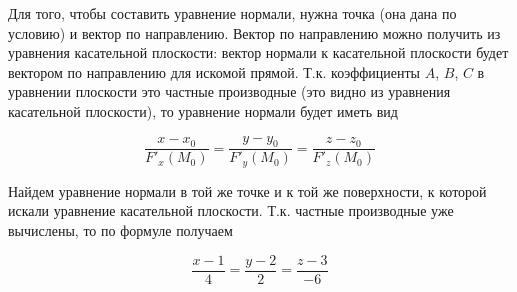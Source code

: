 
Для того, чтобы составить уравнение нормали, нужна точка (она дана по условию) и
вектор по направлению. Вектор по направлению можно получить из уравнения
касательной плоскости: вектор нормали к касательной плоскости будет вектором по
направлению для искомой прямой. Т.к. коэффициенты \(A\), \(B\), \(C\) в
уравнении плоскости это частные производные (это видно из уравнения касательной
плоскости), то уравнение нормали будет иметь вид

\begin{equation*}
  \frac{x - x_0}{F'_x(M_0)}
  = \frac{y - y_0}{F'_y(M_0)}
  = \frac{z - z_0}{F'_z(M_0)}
\end{equation*}

\begin{example}
  Найдем уравнение нормали в той же точке и к той же поверхности, к которой
  искали уравнение касательной плоскости. Т.к. частные производные уже
  вычислены, то по формуле получаем

  \begin{equation*}
    \frac{x - 1}{4} = \frac{y - 2}{2} = \frac{z - 3}{-6}
  \end{equation*}
\end{example}

